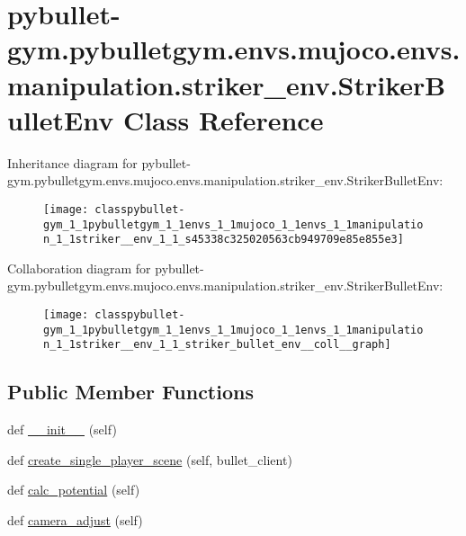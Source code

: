 \hypertarget{classpybullet-gym_1_1pybulletgym_1_1envs_1_1mujoco_1_1envs_1_1manipulation_1_1striker__env_1_1_striker_bullet_env}{}\section{pybullet-\/gym.pybulletgym.\+envs.\+mujoco.\+envs.\+manipulation.\+striker\+\_\+env.\+Striker\+Bullet\+Env Class Reference}
\label{classpybullet-gym_1_1pybulletgym_1_1envs_1_1mujoco_1_1envs_1_1manipulation_1_1striker__env_1_1_striker_bullet_env}


Inheritance diagram for pybullet-\/gym.pybulletgym.\+envs.\+mujoco.\+envs.\+manipulation.\+striker\+\_\+env.\+Striker\+Bullet\+Env\+:
\nopagebreak
\begin{figure}[H]
\begin{center}
\leavevmode
\texttt{[image: classpybullet-gym\_1\_1pybulletgym\_1\_1envs\_1\_1mujoco\_1\_1envs\_1\_1manipulation\_1\_1striker\_\_env\_1\_1\_s45338c325020563cb949709e85e855e3]}
\end{center}
\end{figure}


Collaboration diagram for pybullet-\/gym.pybulletgym.\+envs.\+mujoco.\+envs.\+manipulation.\+striker\+\_\+env.\+Striker\+Bullet\+Env\+:
\nopagebreak
\begin{figure}[H]
\begin{center}
\leavevmode
\texttt{[image: classpybullet-gym\_1\_1pybulletgym\_1\_1envs\_1\_1mujoco\_1\_1envs\_1\_1manipulation\_1\_1striker\_\_env\_1\_1\_striker\_bullet\_env\_\_coll\_\_graph]}
\end{center}
\end{figure}
\subsection*{Public Member Functions}
\begin{DoxyCompactItemize}
\item 
def \hyperlink{classpybullet-gym_1_1pybulletgym_1_1envs_1_1mujoco_1_1envs_1_1manipulation_1_1striker__env_1_1_striker_bullet_env_ae872440f6665fb585e62c4ab4fc4e270}{\+\_\+\+\_\+init\+\_\+\+\_\+} (self)
\item 
def \hyperlink{classpybullet-gym_1_1pybulletgym_1_1envs_1_1mujoco_1_1envs_1_1manipulation_1_1striker__env_1_1_striker_bullet_env_add938380e97662fdb7f72072cf60f5f1}{create\+\_\+single\+\_\+player\+\_\+scene} (self, bullet\+\_\+client)
\item 
def \hyperlink{classpybullet-gym_1_1pybulletgym_1_1envs_1_1mujoco_1_1envs_1_1manipulation_1_1striker__env_1_1_striker_bullet_env_ac75072748a994f611b26825b086d75b4}{calc\+\_\+potential} (self)
\item 
def \hyperlink{classpybullet-gym_1_1pybulletgym_1_1envs_1_1mujoco_1_1envs_1_1manipulation_1_1striker__env_1_1_striker_bullet_env_a77cd2abb736bf6301adb3ae232529fe2}{camera\+\_\+adjust} (self)
\end{DoxyCompactItemize}
